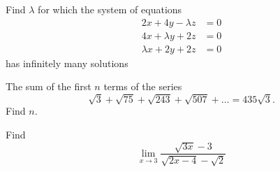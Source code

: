 \documentclass[journal,12pt,twocolumn]{IEEEtran}
\begin{document}
%
\begin{problem}
Find $\lambda$ for which the system of equations
%
\begin{equation}
\begin{split}
2x+4y-\lambda z&=0 \\
4x+\lambda y+2z&=0 \\
\lambda x+2y+2z&=0
\end{split}
\end{equation}
%
has infinitely many solutions
\end{problem}
%
%
%
\begin{problem}
The sum of the first $n$ terms of the series
\begin{equation}
\sqrt{3} + 	\sqrt{75}+\sqrt{243}+\sqrt{507}+\dots = 435\sqrt{3}.
\end{equation}
Find $n$.
\end{problem}
%
%
\begin{problem}
Find
%
\begin{equation}
\lim_{x \rightarrow 3} \frac{\sqrt{3x}-3}{\sqrt{2x-4}-\sqrt{2}}
\end{equation}
%
\end{problem}
%
%
\end{document}
